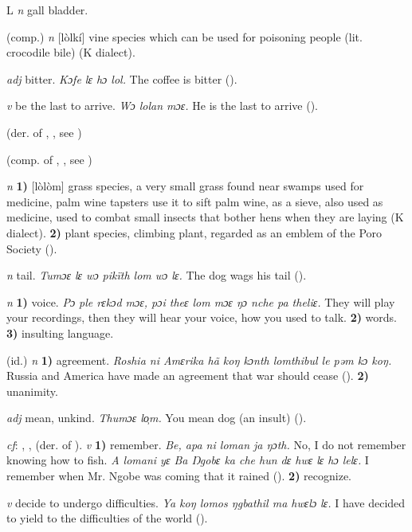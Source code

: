 \begin{letter}{L}
 \textit{n} gall bladder.

 (comp.) \textit{n} [lòlkí] vine species which can be used for poisoning people (lit. crocodile bile) (K dialect). 

 \textit{adj} bitter. \textit{Kɔfe lɛ hɔ lol.} The coffee is bitter (\citealt{Pichl1967}).

 \textit{v} be the last to arrive. \textit{Wɔ lolan mɔɛ.} He is the last to arrive (\citealt{Pichl1967}). 

 (der. of , , see )

 (comp. of , , see ) 

 \textit{n} \textbf{1)} [lòlòm] grass species, a very small grass found near swamps used for medicine, palm wine tapsters use it to sift palm wine, as a sieve, also used as medicine, used to combat small insects that bother hens when they are laying (K dialect). \textbf{2)} plant species, climbing plant, regarded as an emblem of the Poro Society (\citealt{Pichl1967}). 

 \textit{n} tail. \textit{Tumɔɛ lɛ wɔ pikïth lom wɔ lɛ.} The dog wags his tail (\citealt{Pichl1967}). 

 \textit{n} \textbf{1)} voice. \textit{Pɔ ple rɛkɔd mɔɛ, pɔi theɛ lom mɔɛ ŋɔ nche pa theliɛ.} They will play your recordings, then they will hear your voice, how you used to talk. \textbf{2)} words. \textbf{3)} insulting language.

 (id.) \textit{n} \textbf{1)} agreement. \textit{Roshia ni Amɛrika hã koŋ kɔnth lomthibul le pəm kɔ koŋ.} Russia and America have made an agreement that war should cease (\citealt{Pichl1967}). \textbf{2)} unanimity.

 \textit{adj} mean, unkind. \textit{Thumɔɛ lo̹m.} You mean dog (an insult) (\citealt{Pichl1967}).

 \textit{cf}: , ,  (der. of ). \textit{v} \textbf{1)} remember. \textit{Be, apa ni loman ja ŋɔth.} No, I do not remember knowing how to fish. \textit{A lomani yɛ Ba Ŋgobɛ ka che hun dɛ hwɛ lɛ hɔ lelɛ.} I remember when Mr. Ngobe was coming that it rained (\citealt{Pichl1967}). \textbf{2)} recognize.

 \textit{v} decide to undergo difficulties. \textit{Ya koŋ lomos ŋgbathil ma hwɛlɔ lɛ.} I have decided to yield to the difficulties of the world (\citealt{Pichl1967}). 


\end{letter}
